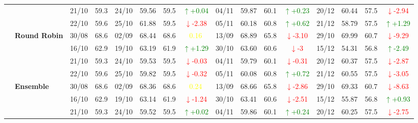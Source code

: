 \documentclass{ieeeaccess}
\begin{document}
{\begin{longtable}{llcc|cccc|cccc|cccc}
&
& 21/10 & 59.3 & 24/10 & 59.56 & 59.5 & \textcolor{green}{\(\uparrow\)+0.04} & 04/11 & 59.87 & 60.1 & \textcolor{green}{\(\uparrow\)+0.23} & 20/12 & 60.44 & 57.5 & \textcolor{red}{\(\downarrow\)-2.94} \\

&
& 22/10 & 59.6 & 25/10 & 61.88 & 59.5 & \textcolor{red}{\(\downarrow\)-2.38} & 05/11 & 60.18 & 60.8 & \textcolor{green}{\(\uparrow\)+0.62} & 21/12 & 58.79 & 57.5 & \textcolor{green}{\(\uparrow\)+1.29} \\
\cmidrule(lr){2-16}


& \textbf{Round Robin}
& 30/08 & 68.6 & 02/09 & 68.44 & 68.6 & \textcolor{yellow}{0.16} & 13/09 & 68.89 & 65.8 & \textcolor{red}{\(\downarrow\)-3.10} & 29/10 & 69.99 & 60.7 & \textcolor{red}{\(\downarrow\)-9.29} \\

&
& 16/10 & 62.9 & 19/10 & 63.19 & 61.9 & \textcolor{green}{\(\uparrow\)+1.29} & 30/10 & 63.60 & 60.6 & \textcolor{red}{\(\downarrow\)-3} & 15/12 & 54.31 & 56.8 & \textcolor{green}{\(\uparrow\)-2.49} \\

&
& 21/10 & 59.3 & 24/10 & 59.53 & 59.5 & \textcolor{red}{\(\downarrow\)-0.03} & 04/11 & 59.79 & 60.1 & \textcolor{red}{\(\downarrow\)-0.31} & 20/12 & 60.37 & 57.5 & \textcolor{red}{\(\downarrow\)-2.87} \\

&
& 22/10 & 59.6 & 25/10 & 59.82 & 59.5 & \textcolor{red}{\(\downarrow\)-0.32} & 05/11 & 60.08 & 60.8 & \textcolor{green}{\(\uparrow\)+0.72} & 21/12 & 60.55 & 57.5 & \textcolor{red}{\(\downarrow\)-3.05} \\
\cmidrule(lr){2-16}

& \textbf{Ensemble}
& 30/08 & 68.6 & 02/09 & 68.36 & 68.6 & \textcolor{yellow}{0.24} & 13/09 & 68.66 & 65.8 & \textcolor{red}{\(\downarrow\)-2.86} & 29/10 & 69.33 & 60.7 & \textcolor{red}{\(\downarrow\)-8.63} \\

&
& 16/10 & 62.9 & 19/10 & 63.14 & 61.9 & \textcolor{red}{\(\downarrow\)-1.24} & 30/10 & 63.41 & 60.6 & \textcolor{red}{\(\downarrow\)-2.51} & 15/12 & 55.87 & 56.8 & \textcolor{green}{\(\uparrow\)+0.93} \\

&
& 21/10 & 59.3 & 24/10 & 59.52 & 59.5 & \textcolor{green}{\(\uparrow\)+0.02} & 04/11 & 59.86 & 60.1 & \textcolor{green}{\(\uparrow\)+0.24} & 20/12 & 60.25 & 57.5 & \textcolor{red}{\(\downarrow\)-2.75} \\


\end{longtable}}
\end{document}
